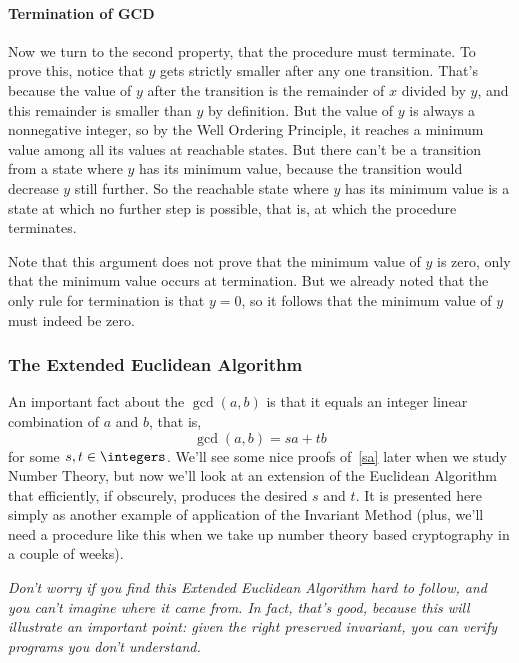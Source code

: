 \paragraph{Termination of GCD}

Now we turn to the second property, that the procedure must terminate.  To
prove this, notice that $y$ gets strictly smaller after any one
transition.  That's because the value of $y$ after the transition is the
remainder of $x$ divided by $y$, and this remainder is smaller than $y$ by
definition.  But the value of $y$ is always a nonnegative integer, so by the
Well Ordering Principle, it reaches a minimum value among all its values
at reachable states.  But there can't be a transition from a state where
$y$ has its minimum value, because the transition would decrease $y$ still
further.  So the reachable state where $y$ has its minimum value is a
state at which no further step is possible, that is, at which the
procedure terminates.

Note that this argument does not prove that the minimum value of $y$ is
zero, only that the minimum value occurs at termination.  But we already
noted that the only rule for termination is that $y=0$, so it follows that
the minimum value of $y$ must indeed be zero.

\subsubsection{The Extended Euclidean Algorithm}\label{ExtendedGCD}

An important fact about the $\gcd(a,b)$ is that it equals an integer
linear combination of $a$ and $b$, that is,
\begin{equation}\label{sa}
\gcd(a,b) = sa+ tb
\end{equation}
for some $s,t \in \integers$.  We'll see some nice proofs
of~\eqref{sa} later when we study Number Theory, but now we'll look
at an extension of the Euclidean Algorithm that efficiently, if
obscurely, produces the desired $s$ and $t$.  It is presented here
simply as another example of application of the Invariant Method
(plus, we'll need a procedure like this when we take up number theory
based cryptography in a couple of weeks).

\emph{Don't worry if you find this Extended Euclidean Algorithm hard to
  follow, and you can't imagine where it came from.  In fact, that's good,
  because this will illustrate an important point: given the right
  preserved invariant, you can verify programs you don't understand.}

